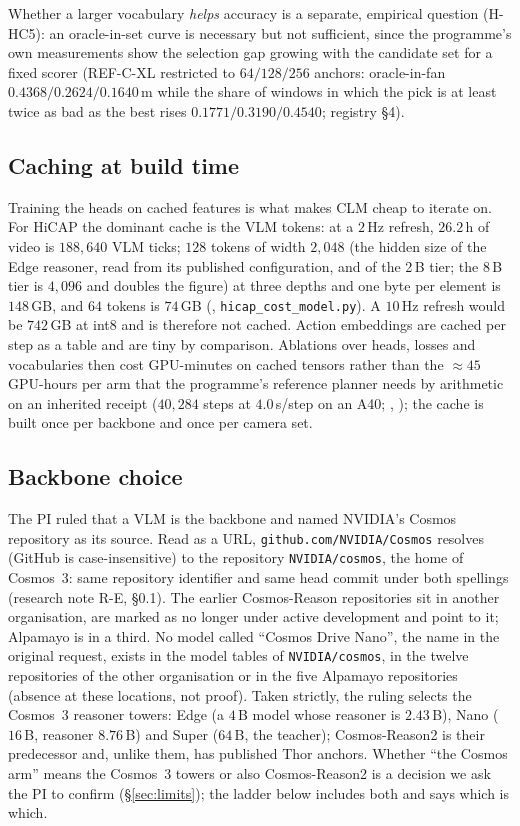 Whether a larger vocabulary \emph{helps} accuracy is a separate, empirical question (H-HC5): an oracle-in-set curve is necessary but not sufficient, since the programme's own measurements show the selection gap growing with the candidate set for a fixed scorer (REF-C-XL restricted to $64/128/256$ anchors: oracle-in-fan $0.4368/0.2624/0.1640$\,m while the share of windows in which the pick is at least twice as bad as the best rises $0.1771/0.3190/0.4540$; registry \S4)\evI.

\subsection{Caching at build time}
Training the heads on cached features is what makes CLM cheap to iterate on. For HiCAP the dominant cache is the VLM tokens: at a $2$\,Hz refresh, $26.2$\,h of video is $188{,}640$ VLM ticks; $128$ tokens of width $2{,}048$ (the hidden size of the Edge reasoner, read from its published configuration, and of the 2\,B tier; the 8\,B tier is $4{,}096$ and doubles the figure) at three depths and one byte per element is $148$\,GB, and $64$ tokens is $74$\,GB (\evE, \texttt{hicap\_cost\_model.py}). A $10$\,Hz refresh would be $742$\,GB at int8 and is therefore not cached. Action embeddings are cached per step as a table and are tiny by comparison.
Ablations over heads, losses and vocabularies then cost GPU-minutes on cached tensors rather than the $\approx45$\,GPU-hours per arm that the programme's reference planner needs by arithmetic on an inherited receipt ($40{,}284$ steps at $4.0$\,s/step on an A40; \evE, \evI); the cache is built once per backbone and once per camera set.

\subsection{Backbone choice}\label{sec:backbone-choice}
The PI ruled that a VLM is the backbone and named NVIDIA's Cosmos repository as its source. Read as a URL, \texttt{github.com/NVIDIA/Cosmos} resolves (GitHub is case-insensitive) to the repository \texttt{NVIDIA/cosmos}, the home of Cosmos~3: same repository identifier and same head commit under both spellings\evM{} (research note R-E, \S0.1). The earlier Cosmos-Reason repositories sit in another organisation, are marked as no longer under active development and point to it; Alpamayo is in a third. No model called ``Cosmos Drive Nano'', the name in the original request, exists in the model tables of \texttt{NVIDIA/cosmos}, in the twelve repositories of the other organisation or in the five Alpamayo repositories (absence at these locations, not proof). Taken strictly, the ruling selects the Cosmos~3 reasoner towers: Edge (a $4$\,B model whose reasoner is $2.43$\,B), Nano ($16$\,B, reasoner $8.76$\,B) and Super ($64$\,B, the teacher); Cosmos-Reason2 is their predecessor and, unlike them, has published Thor anchors. Whether ``the Cosmos arm'' means the Cosmos~3 towers or also Cosmos-Reason2 is a decision we ask the PI to confirm (\S\ref{sec:limits}); the ladder below includes both and says which is which.

